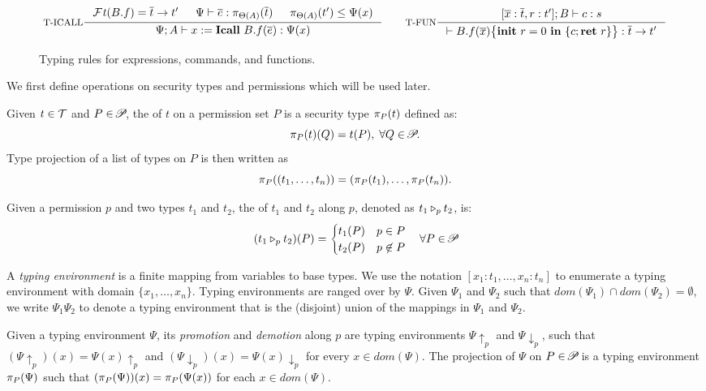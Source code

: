 {{{\begin{figure*}
\[
\inference[T-ICALL]
{\FT(B.f) = \overline{t} \rightarrow t' &
\Psi \vdash \overline{e} : \app{\overline{t}}{\Theta(A)} &
\app{t'}{\Theta(A)} \leq \Psi(x)}
{\Psi; A \vdash \lcCALL{x}{B.f}{\overline{e}} :
 \Psi(x)  }
\qquad
\inference[T-FUN]
{[\overline{x}:\overline{t}, r : t'] ; B\vdash c : s}
{ \vdash \lpFUN{B.f}{\overline{x}}{c} :
  \overline{t} \rightarrow t'}
\]
\caption{Typing rules for expressions, commands, and functions.}
\label{fig:typing-rules}
\end{figure*}


 
We first define operations on security types and permissions which will
be used later.

\begin{definition}\label{def:projection}
Given $t\in\Tcal$ and $P\in\PPS$, the  of $t$ on a permission set $P$ is a security type  $\app{t}{P}$ defined as: \begin{equation*}
\app{t}{P}(Q) = t(P),\; \forall Q\in \PPS.
\end{equation*}
Type projection of a list of types
on $P$ is then written as
{\myeqsize\[
\app{(t_1,\dots,t_n)}{P} = (\app{t_1}{P}, \dots, \app{t_n}{P}).
\]}
\end{definition}

\begin{definition}\label{def:merge}
Given a permission $p$ and two types $t_1$ and $t_2$, the {} of
$t_1$ and $t_2$ along $p$, denoted as $\omerge {p} {t_1} {t_2}$, is:
{\myeqsize\begin{equation*}
(\omerge p {t_1} {t_2}) (P) =
\begin{cases}
t_1(P) & p\in P \\
t_2(P) & p\not\in P\\
\end{cases}
\quad\forall P\in{\PPS}
\end{equation*}}
\end{definition}
A {\em typing environment} is a finite mapping from variables to base types.
We use the notation  $[x_1 : t_1, \dots, x_n : t_n]$
to enumerate a typing environment with domain $\{x_1,\dots,x_n\}.$
Typing environments are ranged over by $\Psi.$
Given $\Psi_1$ and $\Psi_2$ such that $dom(\Psi_1) \cap dom(\Psi_2) = \emptyset$,
we write $\Psi_1\Psi_2$ to denote a typing environment that is the (disjoint) union of the mappings
in $\Psi_1$ and $\Psi_2$.

\begin{definition}\label{def:tenv-pd}
  Given a typing environment $\Psi$, its {\em promotion} and {\em demotion} along $p$
  are typing environments $\Psi\!\uparrow_p$ and $\Psi\!\downarrow_p$, such that
$(\Psi\!\uparrow_{p})(x) = \Psi(x)\!\uparrow_{p}$ and
$(\Psi\!\downarrow_{p})(x) = \Psi(x)\!\downarrow_{p}$ for every $x \in dom(\Psi).$
  The projection of $\Psi$ on $P \in \PPS$ is a typing environment $\app{\Psi}{P}$ such that
$(\app{\Psi}{P})(x) = \app{\Psi(x)}{P}$ for each $x \in dom(\Psi).$
\end{definition}

}}}
